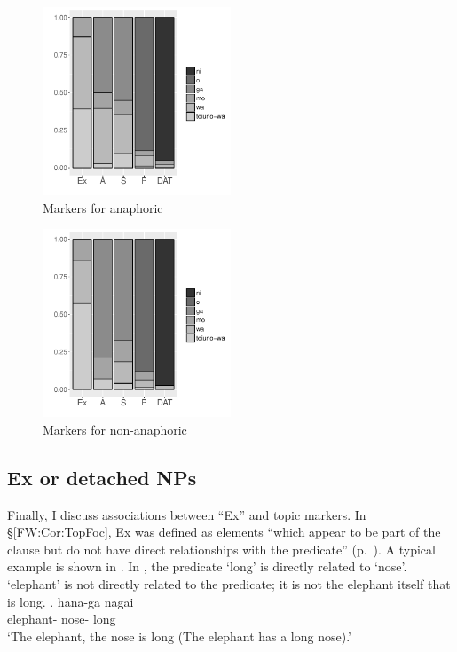 \begin{figure}
	\begin{center}
	\includegraphics[width=0.5\textwidth]{figure/ASPParGiven.pdf}
	\caption{Markers for anaphoric}
	\label{Par:ASPParGivenF}
	\end{center}
\end{figure}
\begin{figure}
	\begin{center}
	\includegraphics[width=0.5\textwidth]{figure/ASPParNew.pdf}
	\caption{Markers for non-anaphoric}
	\label{Par:ASPParNewF}
	\end{center}
\end{figure}


\subsection{Ex or detached NPs}\label{Par:Subj:Ex}

Finally, I discuss associations between ``Ex'' and topic markers.
In \S \ref{FW:Cor:TopFoc},
Ex was defined as elements ``which appear to be part of the clause but do not have direct relationships with the predicate'' (p.~\pageref{FW:Cor:TopFoc:ExDef}).
A typical example is shown in \Next.
In \Next, the predicate  `long' is directly related to  `nose'.
 `elephant' is not directly related to the predicate;
it is not the elephant itself that is long.
%
\exg.  hana-ga nagai \\
		elephant- nose- long \\
		`The elephant, the nose is long (The elephant has a long nose).' \hfill{\cite{mikami60}}


